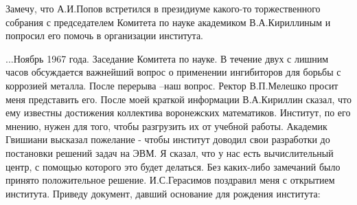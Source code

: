 Замечу, что А.И.Попов встретился в президиуме какого-то торжественного собрания с председателем Комитета по науке академиком В.А.Кириллиным и попросил его помочь в организации института.

...Ноябрь 1967 года. Заседание Комитета по науке. В течение двух с лишним часов обсуждается важнейший вопрос о применении ингибиторов для борьбы с коррозией металла. После перерыва –наш вопрос. Ректор В.П.Мелешко просит меня представить его. После моей краткой информации В.А.Кириллин сказал, что ему известны достижения коллектива воронежских математиков. Институт, по его мнению, нужен для того, чтобы разгрузить их от учебной работы. Академик Гвишиани высказал пожелание - чтобы институт доводил свои разработки до постановки решений задач на ЭВМ. Я сказал, что у нас есть вычислительный центр, с помощью которого это будет делаться. Без каких-либо замечаний было принято положительное решение. И.С.Герасимов поздравил меня с открытием института. Приведу документ, давший основание для рождения института:	

